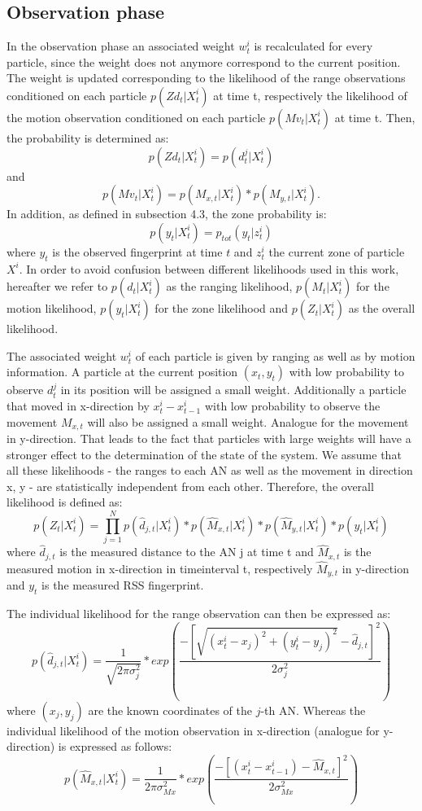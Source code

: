 \subsection{Observation phase}
In the observation phase an associated weight $w^{i}_{t}$ is recalculated for every particle, since the weight does not anymore correspond to the current position. The weight is updated corresponding to the likelihood of the range observations conditioned on each particle $p(Zd_{t} | X^{i}_{t})$ at time t, respectively the likelihood of the motion observation conditioned on each particle $p(Mv_{t} | X^{i}_{t})$ at time t. Then, the probability is determined as:
$$ p(Zd_{t} | X^{i}_{t}) = p(d_{t}^{j} | X^{i}_{t}) $$
and $$ p(Mv_{t} | X^{i}_{t}) = p(M_{x,t} | X^{i}_{t}) * p(M_{y,t} | X^{i}_{t}).$$ 
In addition, as defined in subsection 4.3, the zone probability is:
$$ p(y_t | X^{i}_{t}) = p_{tot}(y_{t} | z^{i}_{t})$$
where $y_t$ is the observed fingerprint at time $t$ and $z^{i}_{t}$ the current zone of particle $X^{i}$.
In order to avoid confusion between different likelihoods used in this work, hereafter we refer to $p(d_{t} | X^{i}_{t})$ as the ranging likelihood, $p(M_{t} | X^{i}_{t})$ for the motion likelihood, $p(y_t | X^{i}_{t})$ for the zone likelihood and $p(Z_{t} | X^{i}_{t})$ as the overall likelihood.

The associated weight $w^{i}_{t}$ of each particle is given by ranging as well as by motion information. A particle at the current position $(x_{t},y_{t})$ with low probability to observe $d_{t}^{j}$ in its position will be assigned a small weight. Additionally a particle that moved in x-direction by $x_{t}^{i}-x_{t-1}^{i}$ with low probability to observe the movement $M_{x,t}$ will also be assigned a small weight. Analogue for the movement in y-direction.
That leads to the fact that particles with large weights will have a stronger effect to the determination of the state of the system.
We assume that all these likelihoods - the ranges to each AN as well as the movement in direction x, y - are statistically independent from each other. Therefore, the overall likelihood is defined as:
$$p(Z_{t} | X^{i}_{t}) = \prod_{j=1}^{N} p(\hat{d}_{j,t}|X_{t}^{i}) * p(\hat{M}_{x,t} | X^{i}_{t}) * p(\hat{M}_{y,t} | X^{i}_{t}) * p(y_t | X^{i}_{t})$$
where $\hat{d}_{j,t}$ is the measured distance to the AN j at time t and $\hat{M}_{x,t}$ is the measured motion in x-direction in timeinterval t, respectively $\hat{M}_{y,t}$ in y-direction and $y_t$ is the measured RSS fingerprint.

The individual likelihood for the range observation can then be expressed as:
$$p(\hat{d}_{j,t} | X^{i}_{t}) = \frac{1}{\sqrt{2\pi \sigma_{j}^{2}}} * exp(\frac{-[\sqrt{(x^{i}_{t}-x_{j})^{2}+(y^{i}_{t}-y_{j})^{2}} - \hat{d}_{j,t}]^{2}}{2\sigma_{j}^{2}})$$
where $(x_{j},y_{j})$ are the known coordinates of the $j$-th AN.
Whereas the individual likelihood of the motion observation in x-direction (analogue for y-direction) is expressed as follows:
$$p(\hat{M}_{x,t} | X^{i}_{t}) = \frac{1}{2\pi \sigma_{Mx}^{2}} * exp(\frac{-[(x^{i}_{t}-x^{i}_{t-1}) - \hat{M}_{x,t}]^{2}}{2\sigma_{Mx}^{2}})$$

